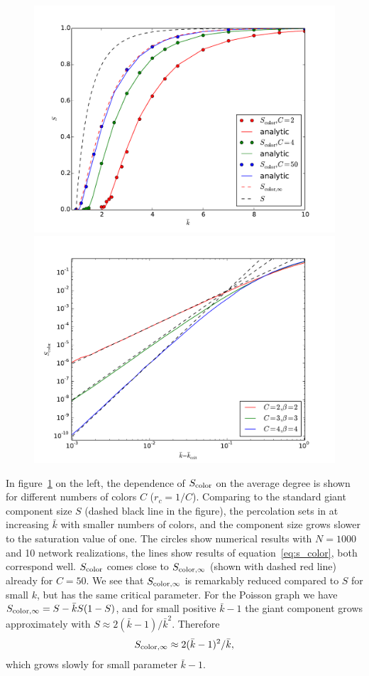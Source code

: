 \documentclass[aps, pre, onecolumn, a4paper, floatfix]{revtex4}
\begin{document}
\begin{figure}[htb]
\begin{center}
	\includegraphics[width=0.52\columnwidth]{S_color_k.pdf}
	\includegraphics[width=0.47\columnwidth]{S_color_k_beta.pdf}
	\caption{}
	\label{fig:pt}
\end{center}
\end{figure}

In figure~\ref{fig:pt} on the left, the dependence of $S_{\rm color}$ on the average degree is shown for different numbers 
of colors $C$ ($r_c=1/C$). Comparing to the standard giant component size $S$ (dashed black line in the figure), 
the percolation sets in at increasing $\bar k$ with smaller numbers of colors, and the component size grows 
slower to the saturation value of one. The circles show numerical results with $N=1000$ and 10 network realizations, 
the lines show results of equation~\ref{eq:s_color}, both correspond well. $S_{\rm color}$ comes close to 
$S_{{\rm color},\infty}$ (shown with dashed red line) already for $C=50$. We see that $S_{{\rm color},\infty}$ 
is remarkably reduced compared to $S$ for small $k$, but has the same critical parameter. 
For the Poisson graph we have $S_{\rm color,\infty}=S-{\bar k} S (1-S)$, and for small positive ${\bar k}-1$ 
the giant component grows approximately with $S\approx 2 ({\bar k}-1)/{\bar k}^2$. Therefore
\begin{align}
S_{\rm color,\infty}\approx 2({\bar k}-1)^2/\bar k,
\end{align}
which grows slowly for small parameter ${\bar k}-1$. 
\end{document}
